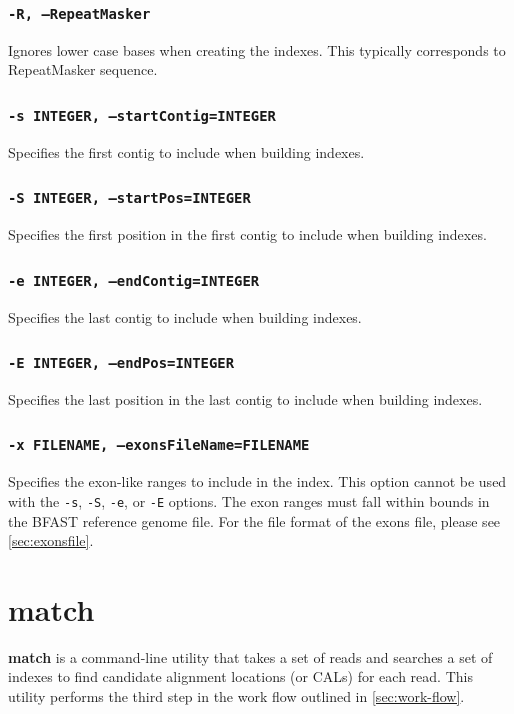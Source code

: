 \documentclass[a4paper,12pt]{book}
\newcommand{\TT}[1]{{\tt #1}} %
\newcommand{\BF}[1]{{\bf #1}} %
\newcommand{\BRGF}{BFAST reference genome file} %
\begin{document}
\subsubsection{\TT{-R, --RepeatMasker}}
Ignores lower case bases when creating the indexes.
This typically corresponds to RepeatMasker sequence.

\subsubsection{\TT{-s INTEGER, --startContig=INTEGER}}
Specifies the first contig to include when building indexes.

\subsubsection{\TT{-S INTEGER, --startPos=INTEGER}}
Specifies the first position in the first contig to include when building indexes.

\subsubsection{\TT{-e INTEGER, --endContig=INTEGER}}
Specifies the last contig to include when building indexes.

\subsubsection{\TT{-E INTEGER, --endPos=INTEGER}}
Specifies the last position in the last contig to include when building indexes.

\subsubsection{\TT{-x FILENAME, --exonsFileName=FILENAME}}
Specifies the exon-like ranges to include in the index.
This option cannot be used with the \TT{-s}, \TT{-S}, \TT{-e}, or \TT{-E} options.
The exon ranges must fall within bounds in the \BRGF{}.
For the file format of the exons file, please see \autoref{sec:exonsfile}.

\section{match}
\label{sec:match}
\BF{match} is a command-line utility that takes a set of reads and searches a set of indexes to find candidate alignment locations (or CALs) for each read.
This utility performs the third step in the work flow outlined in \autoref{sec:work-flow}.
\end{document}
